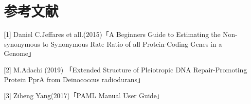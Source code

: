\documentclass[a4j,12pt]{jreport}
\begin{document}
\section{参考文献}
  [1] Daniel C.Jeffares et all.(2015)「A Beginners Guide to Estimating the Non-synonymous to Synonymous Rate Ratio of all Protein-Coding Genes in a Genome」

  [2] M.Adachi (2019) 「Extended Structure of Pleiotropic DNA Repair-Promoting Protein PprA from Deinococcus radiodurans」

  [3] Ziheng Yang(2017)「PAML Manual User Guide」
  
\end{document}
